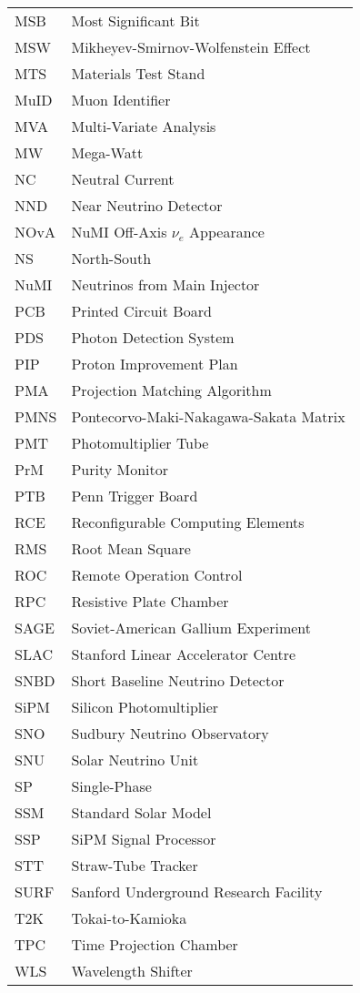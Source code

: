 \begin{longtable}{l p{11cm}}
MSB         & Most Significant Bit \\
MSW         & Mikheyev-Smirnov-Wolfenstein Effect \\
MTS         & Materials Test Stand \\
MuID        & Muon Identifier \\
MVA         & Multi-Variate Analysis \\
MW          & Mega-Watt \\
NC          & Neutral Current \\
NND         & Near Neutrino Detector \\
NOvA        & NuMI Off-Axis $\nu_e$ Appearance \\
NS          & North-South \\
NuMI        & Neutrinos from Main Injector \\
PCB         & Printed Circuit Board \\
PDS         & Photon Detection System \\
PIP         & Proton Improvement Plan \\
PMA         & Projection Matching Algorithm \\
PMNS        & Pontecorvo-Maki-Nakagawa-Sakata Matrix \\
PMT         & Photomultiplier Tube \\
PrM         & Purity Monitor \\
PTB         & Penn Trigger Board \\
RCE         & Reconfigurable Computing Elements \\
RMS         & Root Mean Square \\
ROC         & Remote Operation Control \\
RPC         & Resistive Plate Chamber \\
SAGE        & Soviet-American Gallium Experiment \\
SLAC        & Stanford Linear Accelerator Centre \\
SNBD        & Short Baseline Neutrino Detector \\
SiPM        & Silicon Photomultiplier \\
SNO         & Sudbury Neutrino Observatory \\
SNU         & Solar Neutrino Unit \\
SP          & Single-Phase \\
SSM         & Standard Solar Model \\
SSP         & SiPM Signal Processor \\
STT         & Straw-Tube Tracker \\
SURF        & Sanford Underground Research Facility \\
T2K         & Tokai-to-Kamioka \\
TPC         & Time Projection Chamber \\
WLS         & Wavelength Shifter \\
\end{longtable}



